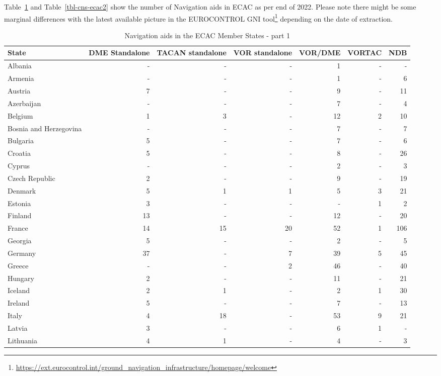 \documentclass[
  11pt,
  a4paper,
]{book}
\DeclareRobustCommand{\href}[2]{#2\footnote{\url{#1}}}
\begin{document}
Table~\ref{tbl-cns-ecac1} and Table~\ref{tbl-cns-ecac2} show the number
of Navigation aids in ECAC as per end of 2022. Please note there might
be some marginal differences with the latest available picture in the
\href{https://ext.eurocontrol.int/ground_navigation_infrastructure/homepage/welcome}{EUROCONTROL
GNI tool} depending on the date of extraction.

\hypertarget{tbl-cns-ecac1}{}
\setlength{\LTpost}{0mm}
\begin{longtable}{lrrrrrr}
\caption{\label{tbl-cns-ecac1}Navigation aids in the ECAC Member States - part 1 }\tabularnewline

\toprule
State & DME Standalone & TACAN standalone & VOR standalone & VOR/DME & VORTAC & NDB \\ 
\midrule
Albania & - & - & - & 1 & - & - \\ 
Armenia & - & - & - & 1 & - & 6 \\ 
Austria & 7 & - & - & 9 & - & 11 \\ 
Azerbaijan & - & - & - & 7 & - & 4 \\ 
Belgium & 1 & 3 & - & 12 & 2 & 10 \\ 
Bosnia and Herzegovina & - & - & - & 7 & - & 7 \\ 
Bulgaria & 5 & - & - & 7 & - & 6 \\ 
Croatia & 5 & - & - & 8 & - & 26 \\ 
Cyprus & - & - & - & 2 & - & 3 \\ 
Czech Republic & 2 & - & - & 9 & - & 19 \\ 
Denmark & 5 & 1 & 1 & 5 & 3 & 21 \\ 
Estonia & 3 & - & - & - & 1 & 2 \\ 
Finland & 13 & - & - & 12 & - & 20 \\ 
France & 14 & 15 & 20 & 52 & 1 & 106 \\ 
Georgia & 5 & - & - & 2 & - & 5 \\ 
Germany & 37 & - & 7 & 39 & 5 & 45 \\ 
Greece & - & - & 2 & 46 & - & 40 \\ 
Hungary & 2 & - & - & 11 & - & 21 \\ 
Iceland & 2 & 1 & - & 2 & 1 & 30 \\ 
Ireland & 5 & - & - & 7 & - & 13 \\ 
Italy & 4 & 18 & - & 53 & 9 & 21 \\ 
Latvia & 3 & - & - & 6 & 1 & - \\ 
Lithuania & 4 & 1 & - & 4 & - & 3 \\ 

\end{longtable}
\end{document}
